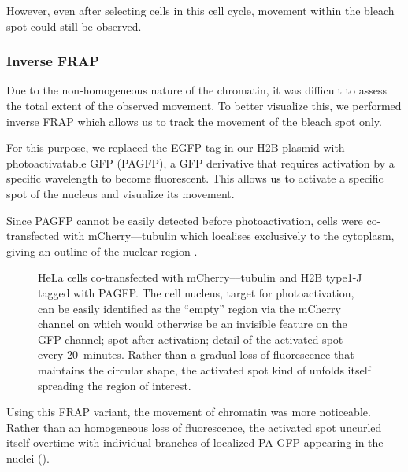       However, even after selecting cells in this cell cycle, movement within
      the bleach spot could still be observed.

    \subsubsection{Inverse FRAP}

      Due to the non-homogeneous nature of the chromatin, it was difficult
      to assess the total extent of the observed movement. To
      better visualize this, we performed inverse FRAP which allows us
      to track the movement of the bleach spot only.

      For this purpose, we replaced the EGFP tag in our H2B plasmid
      with photoactivatable GFP (PAGFP), a GFP derivative that requires
      activation by a specific wavelength to become fluorescent. This
      allows us to activate a specific spot of the nucleus and visualize
      its movement.

      Since PAGFP cannot be easily detected before photoactivation, cells
      were co-transfected with mCherry--\textalpha--tubulin which localises
      exclusively to the cytoplasm, giving an outline of the nuclear region
      .

      \begin{figure}
        \centering
        \hfill
          {
            HeLa cells co-transfected with mCherry--\textalpha--tubulin and
            H2B type1-J tagged with PAGFP.
             The cell nucleus, target
            for photoactivation, can be easily identified as the ``empty''
            region via the mCherry channel on which would otherwise be an
            invisible feature on the GFP channel;
             spot after activation;
             detail of the
            activated spot every 20~minutes. Rather than a gradual loss of
            fluorescence that maintains the circular shape, the activated spot
            kind of unfolds itself spreading the region of interest.
          }
        \label{fig:kill-frap:ifrap}
      \end{figure}

      Using this FRAP variant, the movement of chromatin was more noticeable.
      Rather than an homogeneous loss of fluorescence, the activated
      spot uncurled itself overtime with individual branches of
      localized PA-GFP appearing in the nuclei ().
